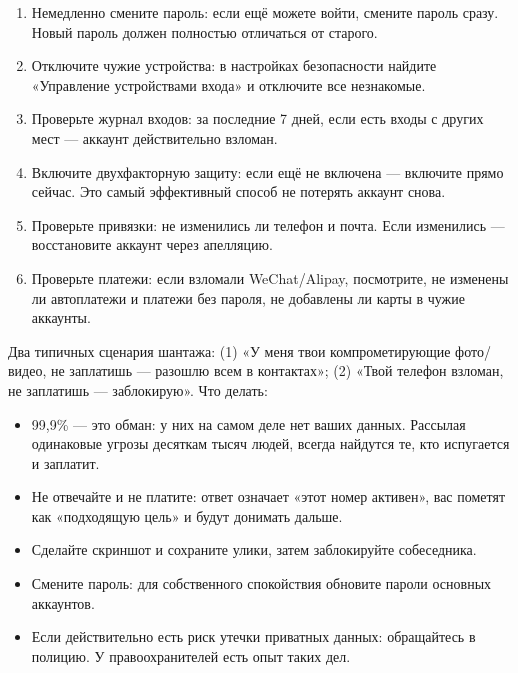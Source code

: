 
\begin{enumerate}
  \item Немедленно смените пароль: если ещё можете войти, смените пароль сразу. Новый пароль должен полностью отличаться от старого.
  \item Отключите чужие устройства: в настройках безопасности найдите «Управление устройствами входа» и отключите все незнакомые.
  \item Проверьте журнал входов: за последние 7 дней, если есть входы с других мест — аккаунт действительно взломан.
  \item Включите двухфакторную защиту: если ещё не включена — включите прямо сейчас. Это самый эффективный способ не потерять аккаунт снова.
  \item Проверьте привязки: не изменились ли телефон и почта. Если изменились — восстановите аккаунт через апелляцию.
  \item Проверьте платежи: если взломали WeChat/Alipay, посмотрите, не изменены ли автоплатежи и платежи без пароля, не добавлены ли карты в чужие аккаунты.
\end{enumerate}


Два типичных сценария шантажа: (1) «У меня твои компрометирующие фото/видео, не заплатишь — разошлю всем в контактах»; (2) «Твой телефон взломан, не заплатишь — заблокирую». Что делать:

\begin{itemize}
  \item 99,9\% — это обман: у них на самом деле нет ваших данных. Рассылая одинаковые угрозы десяткам тысяч людей, всегда найдутся те, кто испугается и заплатит.
  \item Не отвечайте и не платите: ответ означает «этот номер активен», вас пометят как «подходящую цель» и будут донимать дальше.
  \item Сделайте скриншот и сохраните улики, затем заблокируйте собеседника.
  \item Смените пароль: для собственного спокойствия обновите пароли основных аккаунтов.
  \item Если действительно есть риск утечки приватных данных: обращайтесь в полицию. У правоохранителей есть опыт таких дел.
\end{itemize}


